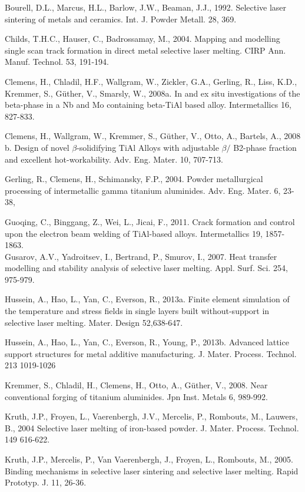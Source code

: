\documentclass[10pt]{article}
\begin{document}
Bourell, D.L., Marcus, H.L., Barlow, J.W., Beaman, J.J., 1992. Selective laser sintering of metals and ceramics. Int. J. Powder Metall. 28, 369.

Childs, T.H.C., Hauser, C., Badrossamay, M., 2004. Mapping and modelling single scan track formation in direct metal selective laser melting. CIRP Ann. Manuf. Technol. 53, 191-194.

Clemens, H., Chladil, H.F., Wallgram, W., Zickler, G.A., Gerling, R., Liss, K.D., Kremmer, S., Güther, V., Smarsly, W., 2008a. In and ex situ investigations of the beta-phase in a Nb and Mo containing beta-TiAl based alloy. Intermetallics 16, 827-833.

Clemens, H., Wallgram, W., Kremmer, S., Güther, V., Otto, A., Bartels, A., 2008 b. Design of novel $\beta$-solidifying TiAl Alloys with adjustable $\beta /$ B2-phase fraction and excellent hot-workability. Adv. Eng. Mater. 10, 707-713.

Gerling, R., Clemens, H., Schimansky, F.P., 2004. Powder metallurgical processing of intermetallic gamma titanium aluminides. Adv. Eng. Mater. 6, 23-38,

Guoqing, C., Binggang, Z., Wei, L., Jicai, F., 2011. Crack formation and control upon the electron beam welding of TiAl-based alloys. Intermetallics 19, 1857-1863.\\
Gusarov, A.V., Yadroitsev, I., Bertrand, P., Smurov, I., 2007. Heat transfer modelling and stability analysis of selective laser melting. Appl. Surf. Sci. 254, 975-979.

Hussein, A., Hao, L., Yan, C., Everson, R., 2013a. Finite element simulation of the temperature and stress fields in single layers built without-support in selective laser melting. Mater. Design 52,638-647.

Hussein, A., Hao, L., Yan, C., Everson, R., Young, P., 2013b. Advanced lattice support structures for metal additive manufacturing. J. Mater. Process. Technol. 213 1019-1026

Kremmer, S., Chladil, H., Clemens, H., Otto, A., Güther, V., 2008. Near conventional forging of titanium aluminides. Jpn Inst. Metals 6, 989-992.

Kruth, J.P., Froyen, L., Vaerenbergh, J.V., Mercelis, P., Rombouts, M., Lauwers, B., 2004 Selective laser melting of iron-based powder. J. Mater. Process. Technol. 149 616-622.

Kruth, J.P., Mercelis, P., Van Vaerenbergh, J., Froyen, L., Rombouts, M., 2005. Binding mechanisms in selective laser sintering and selective laser melting. Rapid Prototyp. J. 11, 26-36.
\end{document}
